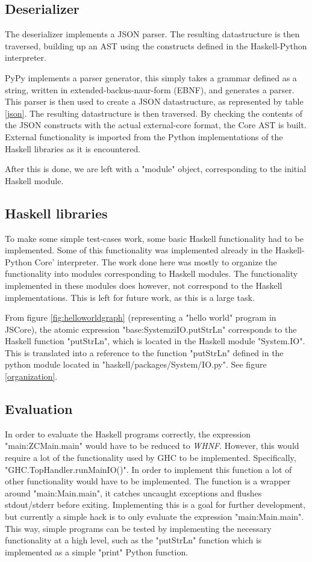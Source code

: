 \subsection{Deserializer}

The deserializer implements a JSON parser. The resulting datastructure is then traversed, building up
an AST using the constructs defined in the Haskell-Python interpreter. 

PyPy implements a parser generator, this simply takes a grammar defined as a string, written in
extended-backus-naur-form (EBNF), and generates a parser. This parser is then used to create a 
JSON datastructure, as represented by table \ref{json}.
The resulting datastructure is then traversed. By checking the contents of the JSON constructs
with the actual external-core format, the Core AST is built. External functionality is imported
from the Python implementations of the Haskell libraries as it is encountered. 

After this is done, we are left with a "module" object, corresponding to the initial Haskell
module. 

\subsection{Haskell libraries}

To make some simple test-cases work, some basic Haskell functionality had to be implemented.
Some of this functionality was implemented already in the Haskell-Python Core' interpreter.
The work done here was mostly to organize the functionality into modules corresponding
to Haskell modules. The functionality implemented in these modules does however, not correspond
to the Haskell implementations. This is left for future work, as this is a large task.

From figure \ref{fig:helloworldgraph} (representing a "hello world" program in JSCore), the atomic 
expression "base:SystemziIO.putStrLn" corresponds
to the Haskell function "putStrLn", which is located in the Haskell module "System.IO". This is translated
into a reference to the function "putStrLn" defined in the python module located in 
"haskell/packages/System/IO.py". See figure \ref{organization}.

\subsection{Evaluation}

In order to evaluate the Haskell programs correctly, the expression "main:ZCMain.main" would have
to be reduced to \emph{WHNF}. However, this would require a lot of the functionality used by GHC
to be implemented. Specifically, "GHC.TopHandler.runMainIO()". In order to implement this function
a lot of other functionality would have to be implemented. The function is a wrapper around 
"main:Main.main", it catches uncaught exceptions and flushes stdout/stderr before exiting. 
Implementing this is a goal for further
development, but currently a simple hack is to only evaluate the expression "main:Main.main". This way,
simple programs can be tested by implementing the necessary functionality at a high level, such as the
"putStrLn" function which is implemented as a simple "print" Python function.


